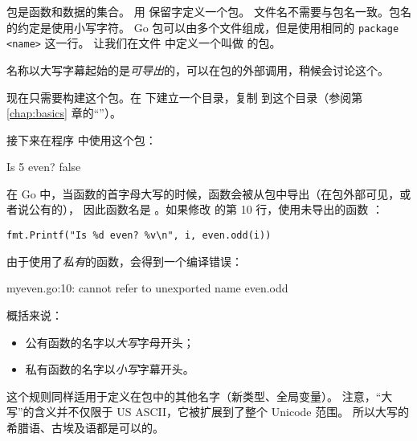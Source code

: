 \noindent{}
包是函数和数据的集合。
用  保留字定义一个包。
文件名不需要与包名一致。包名的约定是使用小写字符。
Go 包可以由多个文件组成，但是使用相同的 \lstinline{package <name>} 这一行。
让我们在文件  中定义一个叫做  的包。


名称以大写字幕起始的是\emph{可导出}的，可以在包的外部调用，稍候会讨论这个。

现在只需要构建这个包。在  下建立一个目录，复制
 到这个目录（参阅第 \ref{chap:basics} 章的``''）。

\begin{display}
\pr {}      
\pr {}         
\pr {}                
\end{display}

接下来在程序  中使用这个包：


\showremarks

\begin{display}
\pr {}
\pr {}
Is 5 even? false
\end{display}

在 Go 中，当函数的首字母大写的时候，函数会被从包中导出（在包外部可见，或者说公有的），
因此函数名是 。如果修改  的第 10 行，使用未导出的函数
：

\noindent\lstinline{fmt.Printf("Is %d even? %v\n", i, even.odd(i))}

由于使用了\emph{私有}的函数，会得到一个编译错误：
\begin{display}
myeven.go:10: cannot refer to unexported name even.odd
\end{display}

\noindent{}概括来说：
\begin{itemize}
\item 公有函数的名字以\emph{大写}字母开头；
\item 私有函数的名字以\emph{小写}字幕开头。
\end{itemize}
这个规则同样适用于定义在包中的其他名字（新类型、全局变量）。
注意，``大写''的含义并不仅限于 US ASCII，它被扩展到了整个 Unicode 范围。
所以大写的希腊语、古埃及语都是可以的。

